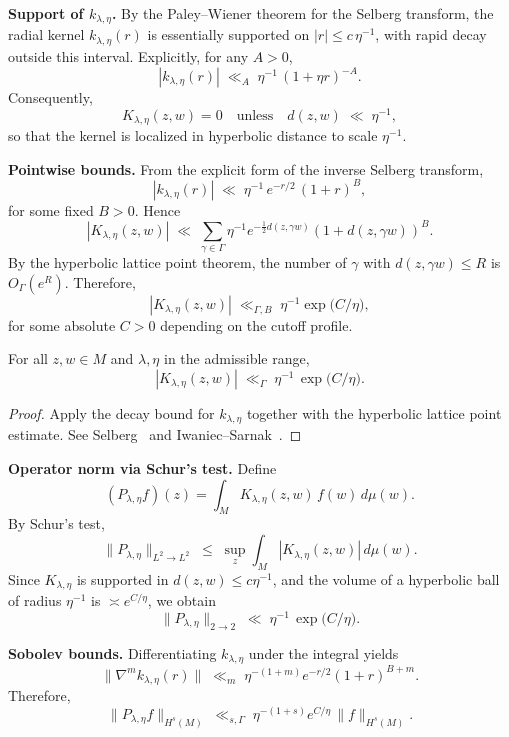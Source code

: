 \medskip

\noindent\textbf{Support of $k_{\lambda,\eta}$.}
By the Paley–Wiener theorem for the Selberg transform,
the radial kernel $k_{\lambda,\eta}(r)$ is essentially supported on $|r|\le c\,\eta^{-1}$,
with rapid decay outside this interval.
Explicitly, for any $A>0$,
\[
  |k_{\lambda,\eta}(r)| \;\ll_{A}\; \eta^{-1}\,(1+\eta r)^{-A}.
\]
Consequently,
\[
  K_{\lambda,\eta}(z,w)=0 \quad\text{unless}\quad d(z,w)\;\ll\;\eta^{-1},
\]
so that the kernel is localized in hyperbolic distance to scale $\eta^{-1}$.

\medskip

\noindent\textbf{Pointwise bounds.}
From the explicit form of the inverse Selberg transform,
\[
  |k_{\lambda,\eta}(r)| \;\ll\; \eta^{-1}\, e^{-r/2}\,(1+r)^{B},
\]
for some fixed $B>0$. 
Hence
\[
  |K_{\lambda,\eta}(z,w)| 
  \;\ll\; \sum_{\gamma\in\Gamma} \eta^{-1} e^{-\tfrac12 d(z,\gamma w)}(1+d(z,\gamma w))^{B}.
\]
By the hyperbolic lattice point theorem,
the number of $\gamma$ with $d(z,\gamma w)\le R$ is $O_\Gamma(e^{R})$.
Therefore,
\[
  |K_{\lambda,\eta}(z,w)| \;\ll_{\Gamma,B}\; \eta^{-1} \exp\!\big(C/\eta\big),
\]
for some absolute $C>0$ depending on the cutoff profile.

\begin{lemma}\label{lem:K-uniform}
For all $z,w\in M$ and $\lambda,\eta$ in the admissible range,
\[
  |K_{\lambda,\eta}(z,w)| \;\ll_{\Gamma}\; \eta^{-1}\,\exp\!\big(C/\eta\big).
\]
\end{lemma}

\begin{proof}
Apply the decay bound for $k_{\lambda,\eta}$ together with the hyperbolic lattice point estimate.
See Selberg~\cite{Selberg1956} and Iwaniec–Sarnak~\cite{IwaniecSarnak1995}.
\end{proof}

\medskip

\noindent\textbf{Operator norm via Schur’s test.}
Define
\[
  (P_{\lambda,\eta}f)(z) = \int_{M} K_{\lambda,\eta}(z,w)\, f(w)\, d\mu(w).
\]
By Schur’s test,
\[
  \|P_{\lambda,\eta}\|_{L^{2}\to L^{2}}
  \;\leq\; \sup_{z}\int_{M}|K_{\lambda,\eta}(z,w)|\,d\mu(w).
\]
Since $K_{\lambda,\eta}$ is supported in $d(z,w)\le c\eta^{-1}$,
and the volume of a hyperbolic ball of radius $\eta^{-1}$ is $\asymp e^{C/\eta}$,
we obtain
\[
  \|P_{\lambda,\eta}\|_{2\to 2} \;\ll\; \eta^{-1}\,\exp\!\big(C/\eta\big).
\]

\medskip

\noindent\textbf{Sobolev bounds.}
Differentiating $k_{\lambda,\eta}$ under the integral yields
\[
  \|\nabla^{m} k_{\lambda,\eta}(r)\| \;\ll_{m}\; \eta^{-(1+m)} e^{-r/2}(1+r)^{B+m}.
\]
Therefore,
\[
  \|P_{\lambda,\eta} f\|_{H^{s}(M)} \;\ll_{s,\Gamma}\; \eta^{-(1+s)} e^{C/\eta}\, \|f\|_{H^{s}(M)}.
\]

